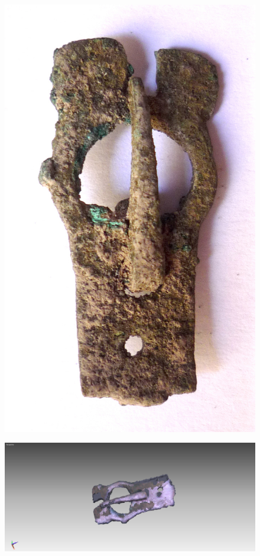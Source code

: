\documentclass{beamer}
\begin{document}
		\begin{frame}
			\begin{multicols}{2}[][]
				\begin{figure}[]
					\begin{center}
						\includegraphics[width=0.7\linewidth]{snap3d/fibbia1}
					\end{center}
					\label{fig:fibbia1}
				\end{figure}
				\begin{figure}[]
					\begin{center}
						\includegraphics[width=1\linewidth,trim=150 0 150 0,clip=true]{snap3d/fibbia2}
					\end{center}
					\label{fig:fibbia2}
				\end{figure}
			\end{multicols}
		\end{frame}
\end{document}
